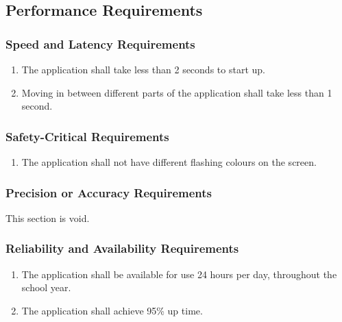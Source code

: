 \documentclass[]{article}
\begin{document}

\subsection{Performance Requirements}
\label{sub:performance_requirements}

\subsubsection{Speed and Latency Requirements}
\label{ssub:speed_and_latency_requirements}
\begin{enumerate}[{PR}1. ]
	\item The application shall take less than 2 seconds to start up.
	\item Moving in between different parts of the application shall take less than
1 second.
\end{enumerate}

\subsubsection{Safety-Critical Requirements}
\label{ssub:safety_critical_requirements}
\begin{enumerate}[{PR}1. ]
	\item The application shall not have different flashing colours on the screen.
\end{enumerate}

\subsubsection{Precision or Accuracy Requirements}
\label{ssub:precision_or_accuracy_requirements}
This section is void.

\subsubsection{Reliability and Availability Requirements}
\label{ssub:reliability_and_availability_requirements}
\begin{enumerate}[{PR}1. ]
	\item The application shall be available for use 24 hours per day, throughout
the school year.
	\item The application shall achieve 95\% up time.
\end{enumerate}
\end{document}
